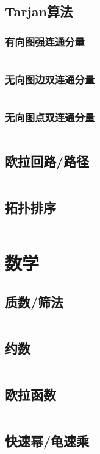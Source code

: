 \documentclass[a4paper,12pt]{article}
\begin{document}
\subsection{Tarjan算法} %
\subsubsection{有向图强连通分量} 
\inputminted[breaklines, linenos]{c++}{graph/tarjan/scc.cc}
\subsubsection{无向图边双连通分量} 
\inputminted[breaklines, linenos]{c++}{graph/tarjan/edcc.cc}
\subsubsection{无向图点双连通分量} 
\inputminted[breaklines, linenos]{c++}{graph/tarjan/vdcc.cc}
\subsection{欧拉回路/路径} %
\inputminted[breaklines, linenos]{c++}{graph/eluer/eluer.cc}
\subsection{拓扑排序} %
\inputminted[breaklines, linenos]{c++}{graph/topsort/top.cc}

\newpage
\section{数学}
\subsection{质数/筛法}
\inputminted[breaklines, linenos]{c++}{math/prime.cc}
\subsection{约数}
\inputminted[breaklines, linenos]{c++}{math/yueshu.cc}
\subsection{欧拉函数}
\inputminted[breaklines, linenos]{c++}{math/eluer.cc}
\subsection{快速幂/龟速乘}
\inputminted[breaklines, linenos]{c++}{math/qmi.cc}
\end{document}
